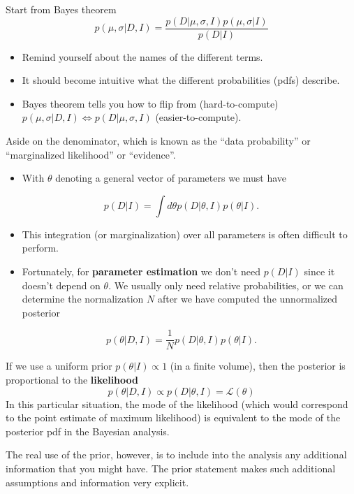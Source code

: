 \documentclass[%
oneside,                 %
final,                   %
10pt]{article}
\begin{document}
Start from Bayes theorem
\[
p(\mu,\sigma | D, I) = \frac{p(D|\mu,\sigma,I) p(\mu,\sigma|I)}{p(D|I)}
\]
\begin{itemize}
\item Remind yourself about the names of the different terms.

\item It should become intuitive what the different probabilities (pdfs) describe.

\item Bayes theorem tells you how to flip from (hard-to-compute) $p(\mu,\sigma | D, I) \Leftrightarrow p(D|\mu,\sigma,I)$ (easier-to-compute).
\end{itemize}

\noindent
Aside on the denominator, which is known as the ``data probability'' or ``marginalized likelihood'' or ``evidence''. 
\begin{itemize}
\item With $\theta$ denoting a general vector of parameters we must have
\end{itemize}

\noindent
\[
p(D|I) = \int d\theta p(D|\theta,I) p(\theta|I).
\]
\begin{itemize}
\item This integration (or marginalization) over all parameters is often difficult to perform.

\item Fortunately, for \textbf{parameter estimation} we don't need $p(D|I)$ since it doesn't depend on $\theta$. We usually only need relative probabilities, or we can determine the normalization $N$ after we have computed the unnormalized posterior 
\end{itemize}

\noindent
\[
p(\theta | D,I) = \frac{1}{N} p(D|\theta,I) p(\theta|I).
\]

If we use a uniform prior $p(\theta | I ) \propto 1$ (in a finite volume), then the posterior is proportional to the \textbf{likelihood}
\[
p(\theta | D,I) \propto p(D|\theta,I) = \mathcal{L}(\theta)
\]
In this particular situation, the mode of the likelihood (which would correspond to the point estimate of maximum likelihood) is equivalent to the mode of the posterior pdf in the Bayesian analysis.

The real use of the prior, however, is to include into the analysis any additional information that you might have. The prior statement makes such additional assumptions and information very explicit.
\end{document}
